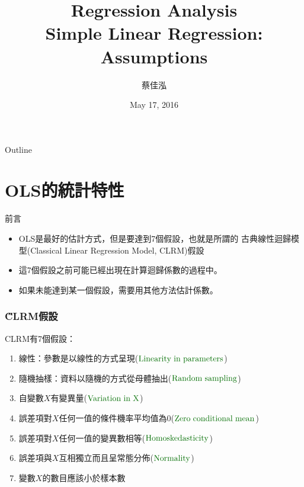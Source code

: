 \documentclass[xcolor=dvipsnames]{beamer}
\author[蔡佳泓]{\K 蔡佳泓}
\title[Statistical Methods for Social Sciences]{Regression Analysis\\
\smallskip
{\small {Simple Linear Regression: Assumptions}}}
\date{May 17, 2016} %
\institute[ESC \& GIEAS]{\H 國立政治大學選舉研究中心暨東亞研究所}
\begin{document}
\maketitle
\begin{frame}{Outline}
\tableofcontents
\end{frame}

\section{OLS的統計特性}
\begin{frame}{前言}
\begin{itemize}
\item OLS是最好的估計方式，但是要達到7個假設，也就是所謂的
古典線性迴歸模型(Classical Linear Regression Model, CLRM)假設
\item 這7個假設之前可能已經出現在計算迴歸係數的過程中。
\item 如果未能達到某一個假設，需要用其他方法估計係數。

\end{itemize}
\end{frame}
\begin{frame}\frametitle{\H CLRM假設}
CLRM有7個假設：
\begin{enumerate}
\item 線性：參數是以線性的方式呈現\hspace{.3em}($\color{rgb:red,4;yellow,3}{\mathrm {Linearity\hspace{.3em} in\hspace{.3em} parameters}}$)
\item 隨機抽樣：資料以隨機的方式從母體抽出\hspace{.3em}($\color{rgb:red,4;yellow,3}{\mathrm {Random \hspace{.3em}sampling}}$)
\item 自變數$X$有變異量\hspace{.3em}($\color{rgb:red,4;yellow,3}{\mathrm {Variation\hspace{.3em} in\hspace{.3em} X}}$)
\item {\K 誤差項}對$X$任何一值的條件機率平均值為0\hspace{.3em}($\color{rgb:red,4;yellow,3}{\mathrm {Zero\hspace{.3em} conditional\hspace{.3em} mean}}$)
\item {\K 誤差項}對$X$任何一值的變異數相等\hspace{.3em}($\color{rgb:red,4;yellow,3}{\mathrm {Homoskedasticity}}$)
\item {\K 誤差項}與$X$互相獨立而且呈常態分佈\hspace{.3em}($\color{rgb:red,4;yellow,3}{\mathrm {Normality}}$)
\item 變數$X$的數目應該小於樣本數
\end{enumerate}
\end{frame}
\end{document}
